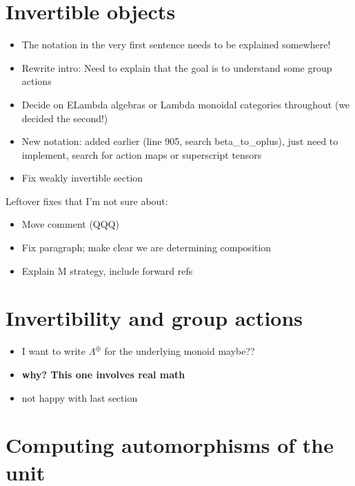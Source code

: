 \documentclass{amsart}
\begin{document}
\section{Invertible objects}

\begin{itemize}
\item The notation in the very first sentence needs to be explained somewhere!
\item Rewrite intro: Need to explain that the goal is to understand some group actions
\item Decide on ELambda algebras or Lambda monoidal categories throughout (we decided the second!)
\item New notation: added earlier (line 905, search beta\_to\_oplus), just need to implement, search for action maps or superscript tensors
\item Fix weakly invertible section
\end{itemize}

Leftover fixes that I'm not sure about:
\begin{itemize}
\item Move comment (QQQ)
\item Fix paragraph; make clear we are determining composition
\item Explain M strategy, include forward refs
\end{itemize}



\section{ Invertibility and group actions}

\begin{itemize}
\item I want to write $\Lambda^{\oplus}$ for the underlying monoid maybe??
\item \textbf{why? This one involves real math}
\item not happy with last section
\end{itemize}



\section{ Computing automorphisms of the unit}
\end{document}

